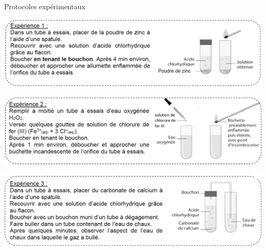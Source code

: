 \begin{doc}{Protocoles expérimentaux}
\begin{minipage}{\linewidth}
\begin{center}
    \includegraphics[scale=0.46]{Images/TP1/Exp_H2.png}
\end{center}
\end{minipage}
\begin{minipage}{\linewidth}
\begin{center}
    \includegraphics[scale=0.46]{Images/TP1/Exp_O2.png}
\end{center}
\end{minipage}
\begin{minipage}{\linewidth}
\begin{center}
    \includegraphics[scale=0.46]{Images/TP1/Exp_CO2.png}
\end{center}
\end{minipage}
\end{doc}

